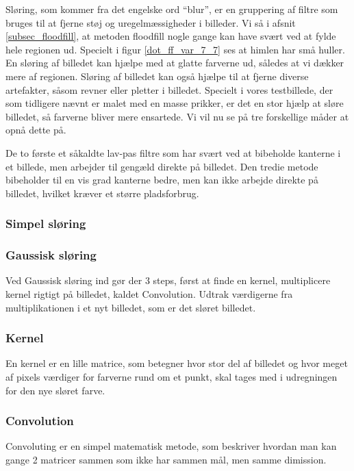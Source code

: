 {
Sløring, som kommer fra det engelske ord ``blur'', er en gruppering af
filtre som bruges til at fjerne støj og uregelmæssigheder i billeder. Vi
så i afsnit \ref{subsec_floodfill}, at metoden floodfill nogle gange kan
have svært ved at fylde hele regionen ud. Specielt i figur
\ref{dot_ff_var_7_7} ses at himlen har små huller. En sløring af
billedet kan hjælpe med at glatte farverne ud, således at vi dækker mere
af regionen. Sløring af billedet kan også hjælpe til at fjerne diverse
artefakter, såsom revner eller pletter i billedet. Specielt i
vores testbillede, der som tidligere nævnt er malet med en masse
prikker, er det en stor hjælp at sløre billedet, så farverne bliver mere
ensartede. Vi vil nu se på tre forskellige måder at opnå dette på.

De to første et såkaldte lav-pas filtre som har svært ved at bibeholde
kanterne i et billede, men arbejder til gengæld direkte på billedet. Den
tredie metode bibeholder til en vis grad kanterne bedre, men kan ikke
arbejde direkte på billedet, hvilket kræver et større pladsforbrug.

\subsubsection*{Simpel sløring}

\subsubsection*{Gaussisk sløring}
Ved Gaussisk sløring ind gør der 3 steps, først at finde en kernel,
multiplicere kernel rigtigt på billedet, kaldet Convolution. Udtrak
værdigerne fra multiplikationen i et nyt billedet, som er det sløret
billedet.

\subsubsection*{Kernel}
En kernel er en lille matrice, som betegner hvor stor del af billedet og
hvor meget af pixels værdiger for farverne rund om et punkt, skal tages
med i udregningen for den nye sløret farve.

\subsubsection*{Convolution}
Convoluting er en simpel matematisk metode, som beskriver hvordan man
kan gange 2 matricer sammen som ikke har sammen mål, men samme
dimission.

}
